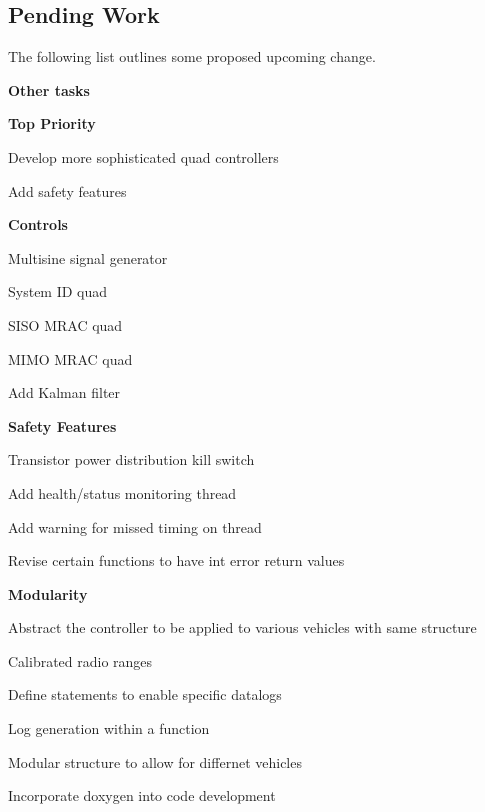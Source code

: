 \subsection*{Pending Work }

The following list outlines some proposed upcoming change.

{\bfseries  Other tasks } 
\begin{DoxyItemize}
\item {\bfseries  Top Priority } 
\begin{DoxyItemize}
\item Develop more sophisticated quad controllers  
\item Add safety features  
\end{DoxyItemize}
\item {\bfseries  Controls } 
\begin{DoxyItemize}
\item Multisine signal generator  
\item System ID quad  
\item S\+I\+SO M\+R\+AC quad  
\item M\+I\+MO M\+R\+AC quad  
\item Add Kalman filter  
\end{DoxyItemize}
\item {\bfseries  Safety Features } 
\begin{DoxyItemize}
\item Transistor power distribution kill switch  
\item Add health/status monitoring thread  
\item Add warning for missed timing on thread  
\item Revise certain functions to have int error return values  
\end{DoxyItemize}
\item {\bfseries  Modularity } 
\begin{DoxyItemize}
\item Abstract the controller to be applied to various vehicles with same structure  
\item Calibrated radio ranges  
\item Define statements to enable specific datalogs  
\item Log generation within a function  
\item Modular structure to allow for differnet vehicles  
\item Incorporate doxygen into code development  
\end{DoxyItemize}

\end{DoxyItemize}
